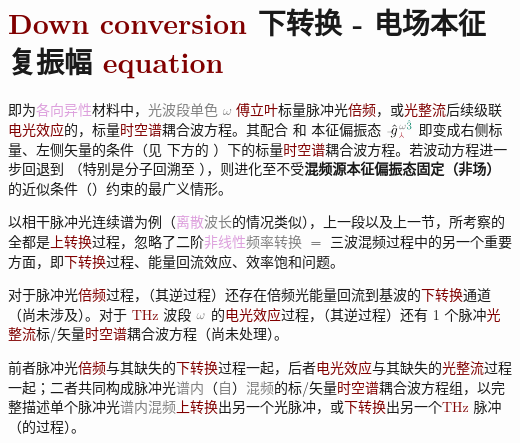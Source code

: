 \section{\textcolor{Maroon}{Down conversion} 下转换 - 电场本征复振幅 \textcolor{Maroon}{equation}}\label{sec:down_convert}

 即为\textcolor{Plum}{各向异性}材料中，\textcolor{gray}{光波段单色 $\omega$} \textcolor{Maroon}{傅立叶}标量\textcolor{NavyBlue}{脉冲光}\textcolor{Maroon}{倍频}，或\textcolor{Maroon}{光整流}后续级联\textcolor{Maroon}{电光效应}的，标量\textcolor{Maroon}{时空谱}耦合波方程。其配合  和 \textcolor{PineGreen}{本征偏振态} $\Xint{{}^{}_{\mathcolor{gray}{-}}}{10}{\hat{g}}^{\;\!\mathcolor{gray}{\omega} \textcolor{PineGreen}{\hat{3}}}_{\;\! \textcolor{Maroon}{\Yup}}$ 即变成右侧标量、左侧矢量的条件（见  下方的 ）下的标量\textcolor{Maroon}{时空谱}耦合波方程。若波动方程进一步回退到 （特别是分子回溯至 ），则进化至不受\textbf{\textcolor{NavyBlue}{混频源}\textcolor{PineGreen}{本征偏振态}固定（非场）}的近似条件（）约束的最广义情形。

以相干\textcolor{NavyBlue}{脉冲光连续谱}为例（\textcolor{Plum}{离散}\textcolor{gray}{波长}的情况类似），上一段以及上一节，所考察的全都是\textcolor{Maroon}{上转换}过程，忽略了二阶\textcolor{Plum}{非线性}\textcolor{gray}{频率转换} $=$ \textcolor{NavyBlue}{三波混频}过程中的另一个重要方面，即\textcolor{Maroon}{下转换}过程、\textcolor{NavyBlue}{能量回流}效应、\textcolor{NavyBlue}{效率饱和}问题。

对于\textcolor{NavyBlue}{脉冲光}\textcolor{Maroon}{倍频}过程，（其逆过程）还存在\textcolor{NavyBlue}{倍频光}能量回流到基波的\textcolor{Maroon}{下转换}通道（尚未涉及）。对于 \textcolor{Maroon}{THz} 波段 $\textcolor{gray}{\omega}$ 的\textcolor{Maroon}{电光效应}过程，（其逆过程）还有 1 个\textcolor{NavyBlue}{脉冲}\textcolor{Maroon}{光整流}标/矢量\textcolor{Maroon}{时空谱}耦合波方程（尚未处理）。

前者\textcolor{NavyBlue}{脉冲光}\textcolor{Maroon}{倍频}与其缺失的\textcolor{Maroon}{下转换}过程一起，后者\textcolor{Maroon}{电光效应}与其缺失的\textcolor{Maroon}{光整流}过程一起；二者共同构成\textcolor{NavyBlue}{脉冲光}\textcolor{gray}{谱内}（\textcolor{gray}{自}）\textcolor{gray}{混频}的标/矢量\textcolor{Maroon}{时空谱}耦合波方程组，以完整描述单个\textcolor{NavyBlue}{脉冲光}\textcolor{gray}{谱内混频}\textcolor{Maroon}{上转换}出另一个\textcolor{NavyBlue}{光脉冲}，或\textcolor{Maroon}{下转换}出另一个\textcolor{Maroon}{THz} \textcolor{NavyBlue}{脉冲}（的过程）。

